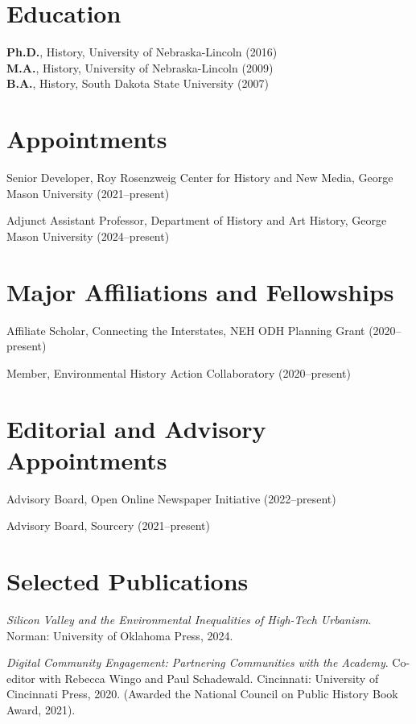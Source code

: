 \section{Education}\label{education}

\textbf{Ph.D.}, History, University of Nebraska-Lincoln (2016)\\
\textbf{M.A.}, History, University of Nebraska-Lincoln (2009)\\
\textbf{B.A.}, History, South Dakota State University (2007)

\section{Appointments}\label{appointments}

Senior Developer, Roy Rosenzweig Center for History and New Media,
George Mason University (2021--present)

Adjunct Assistant Professor, Department of History and Art History,
George Mason University (2024--present)

\section{Major Affiliations and
Fellowships}\label{major-affiliations-and-fellowships}

Affiliate Scholar, Connecting the Interstates, NEH ODH Planning Grant
(2020--present)

Member, Environmental History Action Collaboratory (2020--present)

\section{Editorial and Advisory
Appointments}\label{editorial-and-advisory-appointments}

Advisory Board, Open Online Newspaper Initiative (2022--present)

Advisory Board, Sourcery (2021--present)

\newpage

\section{Selected Publications}\label{selected-publications}

\emph{Silicon Valley and the Environmental Inequalities of High-Tech
Urbanism}. Norman: University of Oklahoma Press, 2024.

\emph{Digital Community Engagement: Partnering Communities with the
Academy}. Co-editor with Rebecca Wingo and Paul Schadewald. Cincinnati:
University of Cincinnati Press, 2020. (Awarded the National Council on
Public History Book Award, 2021).

